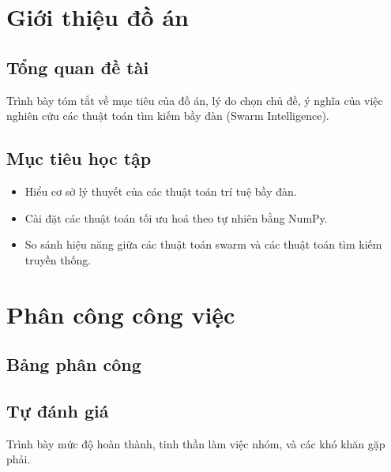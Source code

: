 \documentclass[a4paper]{report}
\begin{document}

\pagestyle{plain} %

\tableofcontents
\thispagestyle{plain} %

\listoffigures
\listoftables

\newpage
\setcounter{page}{1} %
\pagestyle{fancy} %
\fancyhf{}
\fancyhead[R]{\thepage}
\renewcommand{\headrulewidth}{0.4pt}
\renewcommand{\footrulewidth}{0pt}


\chapter{Giới thiệu đồ án}
\section{Tổng quan đề tài}
Trình bày tóm tắt về mục tiêu của đồ án, lý do chọn chủ đề, ý nghĩa của việc nghiên cứu các thuật toán tìm kiếm bầy đàn (Swarm Intelligence).

\section{Mục tiêu học tập}
\begin{itemize}
    \item Hiểu cơ sở lý thuyết của các thuật toán trí tuệ bầy đàn.
    \item Cài đặt các thuật toán tối ưu hoá theo tự nhiên bằng NumPy.
    \item So sánh hiệu năng giữa các thuật toán swarm và các thuật toán tìm kiếm truyền thống.
\end{itemize}

\chapter{Phân công công việc}
\section{Bảng phân công}


\section{Tự đánh giá}
Trình bày mức độ hoàn thành, tinh thần làm việc nhóm, và các khó khăn gặp phải.
\end{document}
